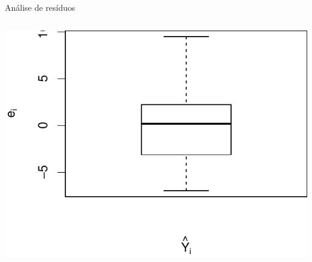 \documentclass{beamer}\usepackage[]{graphicx}\usepackage[]{color}
\newenvironment{knitrout}{}{} %
\renewenvironment{knitrout}{\setlength{\topsep}{0mm}}{}
\begin{document}
\begin{frame}{Análise de resíduos}
\begin{columns}[c]
\begin{knitrout}
\includegraphics[width=1\linewidth]{figure/r7-2} 

\end{knitrout}
\end{columns}

\end{frame}
\end{document}
